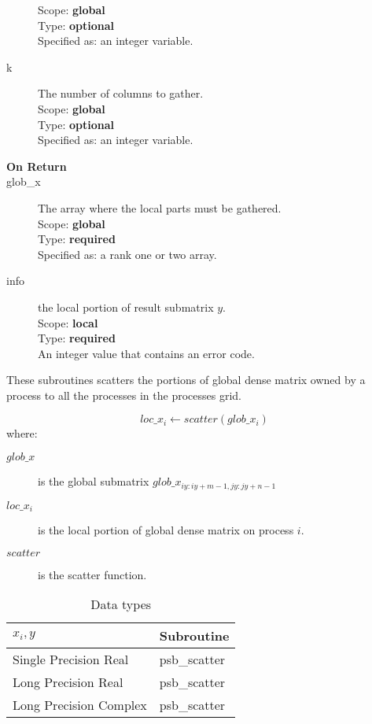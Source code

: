 \begin{description}
Scope: {\bf global} \\
Type: {\bf optional}\\
Specified as: an integer variable.
\item[k]  The number of columns to gather.\\
Scope: {\bf global} \\
Type: {\bf optional}\\
Specified as: an integer variable. 
\item[\bf On Return] 
\item[glob\_x] The array where the local parts must be gathered.\\
Scope: {\bf global} \\
Type: {\bf required}\\
Specified as: a rank one or two array.
\item[info] the local portion of result submatrix $y$.\\
Scope: {\bf local} \\
Type: {\bf required} \\
An integer value that contains an error code. 
\end{description}

%
%


These subroutines scatters the portions of global dense matrix owned
by a process to all the processes in the processes grid.

\[ loc\_x_i \leftarrow scatter(glob\_x_i) \]
where:
\begin{description}
\item[$glob\_x$] is the global submatrix $glob\_x_{iy:iy+m-1,jy:jy+n-1}$
\item[$loc\_x_i$] is the local portion of global dense matrix on
process $i$.
\item[$scatter$] is the scatter function.
\end{description}

\begin{table}[h]
\begin{center}
\begin{tabular}{ll}
\hline
$x_i, y$ & {\bf Subroutine}\\
\hline
Single Precision Real & psb\_scatter\\
Long Precision Real & psb\_scatter \\
Long Precision Complex & psb\_scatter \\
\hline
\end{tabular}
\end{center}
\caption{Data types\label{tab:scatter}}
\end{table}

